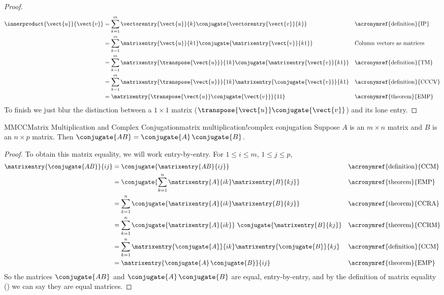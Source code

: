 %
\begin{proof}
%
\begin{align*}
\innerproduct{\vect{u}}{\vect{v}}
%
&=\sum_{k=1}^{m}\vectorentry{\vect{u}}{k}\conjugate{\vectorentry{\vect{v}}{k}}
&&\text{\acronymref{definition}{IP}}\\
%
&=\sum_{k=1}^{m}\matrixentry{\vect{u}}{k1}\conjugate{\matrixentry{\vect{v}}{k1}}
&&\text{Column vectors as matrices}\\
%
&=\sum_{k=1}^{m}\matrixentry{\transpose{\vect{u}}}{1k}\conjugate{\matrixentry{\vect{v}}{k1}}
&&\text{\acronymref{definition}{TM}}\\
%
&=\sum_{k=1}^{m}\matrixentry{\transpose{\vect{u}}}{1k}\matrixentry{\conjugate{\vect{v}}}{k1}
&&\text{\acronymref{definition}{CCCV}}\\
%
&=\matrixentry{\transpose{\vect{u}}\conjugate{\vect{v}}}{11}
&&\text{\acronymref{theorem}{EMP}}\\
\end{align*}
%
To finish we just blur the distinction between a $1\times 1$ matrix ($\transpose{\vect{u}}\conjugate{\vect{v}}$) and its lone entry.
%
\end{proof}
%
\begin{theorem}{MMCC}{Matrix Multiplication and Complex Conjugation}{matrix multiplication!complex conjugation}
Suppose $A$ is an $m\times n$ matrix and $B$ is an $n\times p$ matrix.  Then $\conjugate{AB}=\conjugate{A}\,\conjugate{B}$.
\end{theorem}
%
\begin{proof}
%
To obtain this matrix equality, we will work entry-by-entry.  For $1\leq i\leq m$, $1\leq j\leq p$,
%
\begin{align*}
\matrixentry{\conjugate{AB}}{ij}
%
&=\conjugate{\matrixentry{AB}{ij}}
&&\text{\acronymref{definition}{CCM}}\\
%
&=\conjugate{\sum_{k=1}^{n}\matrixentry{A}{ik}\matrixentry{B}{kj}}
&&\text{\acronymref{theorem}{EMP}}\\
%
&=\sum_{k=1}^{n}\conjugate{\matrixentry{A}{ik}\matrixentry{B}{kj}}
&&\text{\acronymref{theorem}{CCRA}}\\
%
&=\sum_{k=1}^{n}\conjugate{\matrixentry{A}{ik}}\,\,\conjugate{\matrixentry{B}{kj}}
&&\text{\acronymref{theorem}{CCRM}}\\
%
&=\sum_{k=1}^{n}\matrixentry{\conjugate{A}}{ik}\matrixentry{\conjugate{B}}{kj}
&&\text{\acronymref{definition}{CCM}}\\
%
&=\matrixentry{\conjugate{A}\,\conjugate{B}}{ij}
&&\text{\acronymref{theorem}{EMP}}
%
\end{align*}
%
So the matrices $\conjugate{AB}$ and $\conjugate{A}\,\conjugate{B}$ are equal, entry-by-entry, and by the definition of matrix equality () we can say they are equal matrices.
%
\end{proof}
